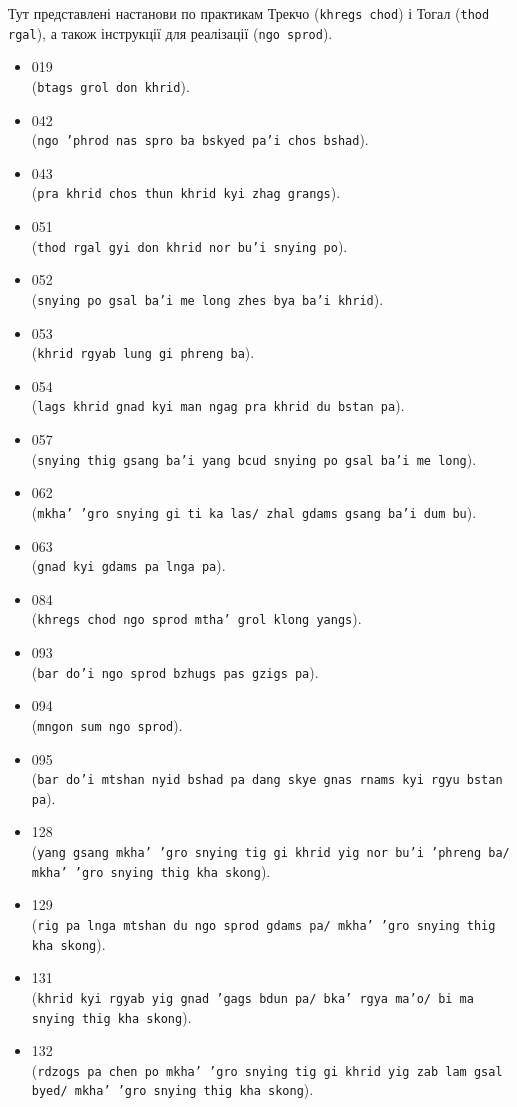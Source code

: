 \documentclass{article}
\begin{document}
Тут представлені настанови по практикам Трекчо (\texttt{khregs chod}) і Тогал (\texttt{thod rgal}),
а також інструкції для реалізації (\texttt{ngo sprod}).

\begingroup\raggedright
\begin{itemize}
\item 019  \\ (\texttt{btags grol don khrid}).
\item 042  \\ (\texttt{ngo 'phrod nas spro ba bskyed pa'i chos bshad}).
\item 043  \\ (\texttt{pra khrid chos thun khrid kyi zhag grangs}).
\item 051  \\ (\texttt{thod rgal gyi don khrid nor bu'i snying po}).
\item 052  \\ (\texttt{snying po gsal ba'i me long zhes bya ba'i khrid}).
\item 053  \\ (\texttt{khrid rgyab lung gi phreng ba}).
\item 054  \\ (\texttt{lags khrid gnad kyi man ngag pra khrid du bstan pa}).
\item 057  \\ (\texttt{snying thig gsang ba'i yang bcud snying po gsal ba'i me long}).
\item 062  \\ (\texttt{mkha' 'gro snying gi ti ka las/ zhal gdams gsang ba'i dum bu}).
\item 063  \\ (\texttt{gnad kyi gdams pa lnga pa}).
\item 084  \\ (\texttt{khregs chod ngo sprod mtha' grol klong yangs}).
\item 093  \\ (\texttt{bar do'i ngo sprod bzhugs pas gzigs pa}).
\item 094  \\ (\texttt{mngon sum ngo sprod}).
\item 095  \\ (\texttt{bar do'i mtshan nyid bshad pa dang skye gnas rnams kyi rgyu bstan pa}).
\item 128  \\ (\texttt{yang gsang mkha' 'gro snying tig gi khrid yig nor bu'i 'phreng ba/ mkha' 'gro snying thig kha skong}).
\item 129  \\ (\texttt{rig pa lnga mtshan du ngo sprod gdams pa/ mkha' 'gro snying thig kha skong}).
\item 131  \\ (\texttt{khrid kyi rgyab yig gnad 'gags bdun pa/ bka' rgya ma'o/ bi ma snying thig kha skong}).
\item 132  \\ (\texttt{rdzogs pa chen po mkha' 'gro snying tig gi khrid yig zab lam gsal byed/ mkha' 'gro snying thig kha skong}).
\end{itemize}
\endgroup
\end{document}
